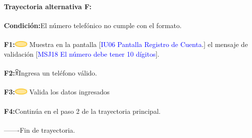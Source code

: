                     \textbf{Trayectoria alternativa F:}\\\\
                        \textbf{Condición:}El número telefónico no cumple con el formato.\\\\
                        \textbf{F1:}\includegraphics[width=0.0500\textwidth]{Figuras/sistema.png} Muestra en la pantalla [\textcolor{blue}{IU06 Pantalla Registro de Cuenta}.] el mensaje de validación [\textcolor{blue}{MSJ18 El número debe tener 10 dígitos}].  \\\\  
                        \textbf{F2:}\includegraphics[width=0.0150\textwidth]{Figuras/persona.png}Ingresa un teléfono válido.\\\\
                        \textbf{F3:}\includegraphics[width=0.0500\textwidth]{Figuras/sistema.png} Valida los datos ingresados\\\\
                        \textbf{F4:}Continúa en el paso 2 de la trayectoria principal. \\\\               
        -------Fin de  trayectoria. \\\\

